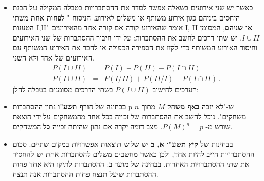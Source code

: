 \documentclass[12pt,a4paper]{article}
\newcommand{\bover}[1]{\bm{\overline{#1}}}
\begin{document}
\begin{itemize}
\item
כאשר יש שני אירועים בשאלה אפשר לסדר את ההסתברויות בטבלה המקילה על הבנת היחסים ביניהם כגון אירוע משותף או משלים לאירוע. הניסוח "%
\textbf{לפחות אחת}
משתי הטענות I,II" אומר שהאירוע קורה אם קורה אחד מהאירועים I, II
\textbf{או שניהם},
המסומן 
$I \cup II$.
יש שתי דרכים לחשב את ההסתברות: על ידי חיבור ההסתברות של שני האירועים וחיסור האירוע המשותף כדי לקזז את הספירה הכפולה או לחבר את האירוע המשותף עם האירועים של אחד ולא השני.
\begin{eqnarray*}
P(I \cup II) &=& P(I) + P(II) - P(I \cap II)\\
P(I \cup II) &=& P(I/ II) + P(II/ I) - P(I \cap II)\,.
\end{eqnarray*}
הערכים לחישוב
$P(I \cup II)$
בשתי הדרכים מסומנים בטבלה להלן:
\begin{center}
\end{center}

\item
בבחינה של
\textbf{חורף תשע"ו}
נתון ההסתברות p ש-"לא יזכה
\textbf{באף משחק}
$M$
מתוך 
$n$
משחקים". נוכל לחשב את ההסתברות של זכייה בכל אחד מהמשחקים על ידי הוצאת שורש מ-%
$P(M)^n=p$.
מצב דומה יקרה אם נתון שהיתה זכייה 
\textbf{כל}
המשחקים.

\item
בבחינות של 
\textbf{קיץ תשע"ו א, ב}
יש שלוש תוצאות אפשרויות במקום שתיים. סכום ההסתברויות חייב להיות אחד, ולכן כאשר מחשבים משלים להסתברות אחת יש להחסיר את שתי ההסתברויות האחרות. בבחינה של מועד ב: ההסתברות לתיקו היא אחד פחות ההסתברות שיעל תנצח פחות ההסתברות אנה תנצח.
\end{itemize}
\end{document}
